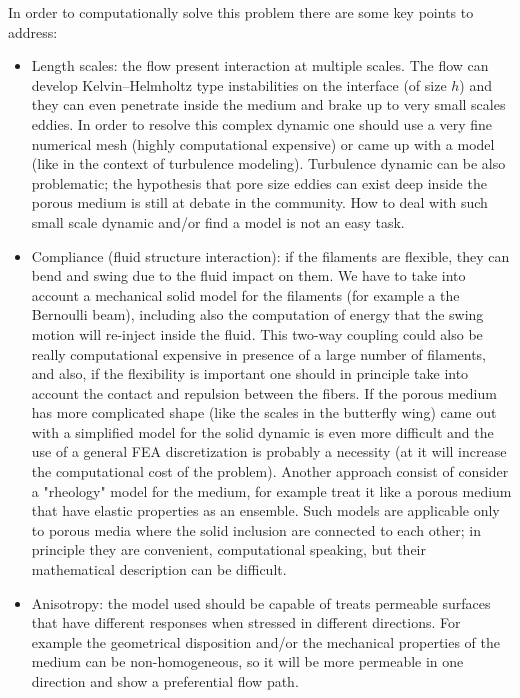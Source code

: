In order to computationally solve this problem there are some key points to address:
\begin{itemize}
	\item Length scales: the flow present interaction at multiple scales. The flow can develop Kelvin–Helmholtz type instabilities on the interface (of size $h$) and they can even penetrate inside the medium and brake up to very small scales eddies. In order to resolve this complex dynamic one should use a very fine numerical mesh (highly computational expensive) or came up with a model (like in the context of turbulence modeling).
	Turbulence dynamic can be also problematic; the hypothesis that pore size eddies can exist deep inside the porous medium is still at debate in the community.
	How to deal with such small scale dynamic and/or find a model is not an easy task.
	
	\item Compliance (fluid structure interaction): if the filaments are flexible, they can bend and swing due to the fluid impact on them.
	We have to take into account a mechanical solid model for the filaments (for example a the Bernoulli beam), including also the computation of energy that the swing motion will re-inject inside the fluid.
	This two-way coupling could also be really computational expensive in presence of a large number of filaments, and also, if the flexibility is important one should in principle take into account the contact and repulsion between the fibers.
	If the porous medium has more complicated shape (like the scales in the butterfly wing) came out with a simplified model for the solid dynamic is even more difficult and the use of a general FEA discretization is probably a necessity (at it will increase the computational cost of the problem).
	Another approach consist of consider a "rheology" model for the medium, for example treat it like a porous medium that have elastic properties as an ensemble.
	Such models are applicable only to porous media where the solid inclusion are connected to each other; in principle they are convenient, computational speaking, but their mathematical description can be difficult.
	
	\item Anisotropy: the model used should be capable of treats permeable surfaces that have different responses when stressed in different directions. For example the geometrical disposition and/or the mechanical properties of the medium can be non-homogeneous, so it will be more permeable in one direction and show a preferential flow path.
\end{itemize}

